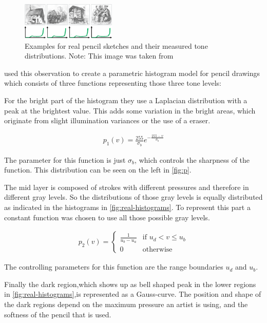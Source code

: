 \begin{figure}[htb]
  \centering
  \includegraphics[width=0.4\textwidth]{images/real-histograms.png}
  \caption{Examples for real pencil sketches and their measured tone
    distributions. Note: This image was taken from \cite{mainPaper}}
  \label{fig:real-histograms}
\end{figure}

\cite{mainPaper} used this observation to create a parametric histogram model
for pencil drawings which consists of three functions representing those
three tone levels:

For the bright part of the histogram they use a Laplacian distribution with a
peak at the brightest value. This adds some variation in the bright areas, which
originate from slight illumination variances or the use of a eraser.

\begin{align}
  p_1(v) = \frac{255}{\sigma_b} e ^{-\frac{255-v}{\sigma_b}} \label{eq:p_1}
\end{align}

The parameter for this function is just $\sigma_b$, which controls the sharpness of
the function. This distribution can be seen on the left 
in \autoref{fig:p}.

The mid layer is composed of strokes with different pressures and therefore in
different gray levels. So the distributions of those gray levels is equally
distributed as indicated in the histograms in \autoref{fig:real-histograms}. To
represent this part a constant function was chosen to use all those possible
gray levels.

\begin{align}
  p_2(v) = \begin{cases} \frac{1}{u_b - u_a} & \text{if } u_d < v \leq u_b\\
    0 & \text{otherwise}
  \end{cases} \label{eq:p_2}
\end{align}

The controlling parameters for this function are the range boundaries $u_d$
and $u_b$.

Finally the dark region,which shows up as bell shaped peak in the lower
regions in \autoref{fig:real-histograms},is represented as a Gauss-curve. The
position and shape of the dark regions depend on the maximum pressure an artist is using,
and the softness of the pencil that is used.

